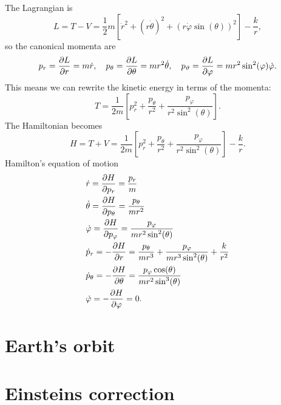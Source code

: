 \documentclass{article}
\begin{document}
        The Lagrangian is 
        \begin{equation*}
            L = T - V = \frac{1}{2}m \left[\dot r^2 + (r \dot \theta)^2 + (r \dot \varphi \sin(\theta))^2\right] - \frac{k}{r},
        \end{equation*}
        so the canonical momenta are
        \begin{equation*}
            p_r = \pdv{L}{r} = m \dot r, \quad p_\theta = \pdv{L}{\theta} = m r^2 \dot \theta, \quad p_\vartheta = \pdv{L}{\varphi} = m r^2 \sin^2(\varphi) \dot \varphi.
        \end{equation*}
        This means we can rewrite the kinetic energy in terms of the momenta:
        \begin{equation*}
            T = \frac{1}{2m} \left[p_r^2 +\frac{p_\theta}{r^2} + \frac{p_\varphi}{r^2 \sin^2(\theta)}\right].
        \end{equation*}
        The Hamiltonian becomes
        \begin{equation*}
            H = T + V = \frac{1}{2m} \left[p_r^2 +\frac{p_\theta}{r^2} + \frac{p_\varphi}{r^2 \sin^2(\theta)}\right] - \frac{k}{r}.
        \end{equation*}
        Hamilton's equation of motion
        \begin{align*}
            & \dot r = \pdv{H}{p_r} = \frac{p_r}{m} \\
            & \dot \theta = \pdv{H}{p_\theta} = \frac{p_\theta}{m r^2} \\
            & \dot \varphi = \pdv{H}{p_\varphi} = \frac{p_\varphi}{m r^2 \sin^2(\theta)} \\
            & \dot p_r = - \pdv{H}{r} = \frac{p_\theta}{m r^3} + \frac{p_\varphi}{m r^3 \sin^2(\theta)} + \frac{k}{r^2} \\
            & \dot p_\theta = - \pdv{H}{\theta} = \frac{p_\varphi \cos(\theta)}{m r^2 \sin^3(\theta)} \\
            & \dot \varphi = - \pdv{H}{\varphi} = 0.
        \end{align*}


    \section{Earth's orbit}

    \section{Einsteins correction}
\end{document}
